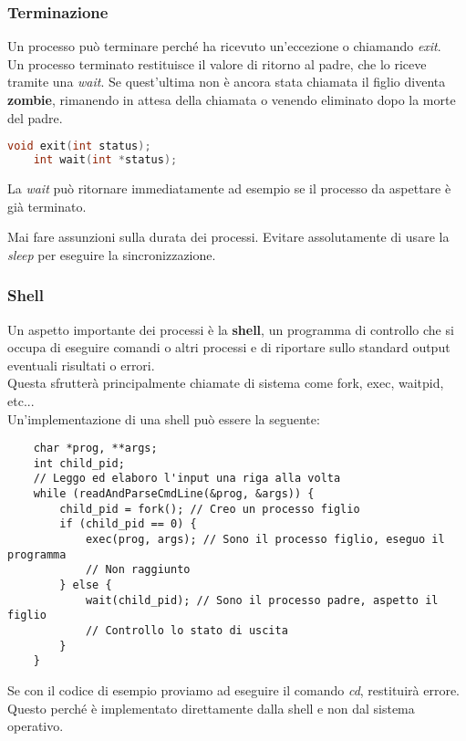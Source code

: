 \subsubsection{Terminazione}
Un processo può terminare perché ha ricevuto un'eccezione o chiamando \emph{exit}.\\ Un processo terminato restituisce il valore di ritorno al padre, che lo riceve tramite una \emph{wait}. Se quest'ultima non è ancora stata chiamata il figlio diventa \textbf{zombie}, rimanendo in attesa della chiamata o venendo eliminato dopo la morte del padre.\\
\begin{lstlisting}[language=C]
	void exit(int status);
	int wait(int *status);
\end{lstlisting}
La \emph{wait} può ritornare immediatamente ad esempio se il processo da aspettare è già terminato.
\begin{note}
	Mai fare assunzioni sulla durata dei processi. Evitare assolutamente di usare la \emph{sleep} per eseguire la sincronizzazione.
\end{note}

\subsubsection{Shell}
Un aspetto importante dei processi è la \textbf{shell}, un programma di controllo che si occupa di eseguire comandi o altri processi e di riportare sullo standard output eventuali risultati o errori.\\ Questa sfrutterà principalmente chiamate di sistema come fork, exec, waitpid, etc...\\
Un'implementazione di una shell può essere la seguente:
\begin{lstlisting}
	char *prog, **args;
	int child_pid;
	// Leggo ed elaboro l'input una riga alla volta
	while (readAndParseCmdLine(&prog, &args)) { 
		child_pid = fork(); // Creo un processo figlio
		if (child_pid == 0) {
			exec(prog, args); // Sono il processo figlio, eseguo il programma
			// Non raggiunto
		} else {
			wait(child_pid); // Sono il processo padre, aspetto il figlio
			// Controllo lo stato di uscita
		}
	}
\end{lstlisting}

\begin{note}
	Se con il codice di esempio proviamo ad eseguire il comando \emph{cd}, restituirà errore. Questo perché è implementato direttamente dalla shell e non dal sistema operativo.
\end{note}

